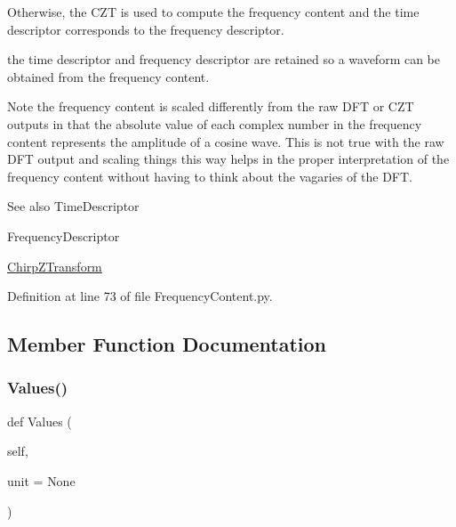 Otherwise, the C\+ZT is used to compute the frequency content and the time descriptor corresponds to the frequency descriptor.

the time descriptor and frequency descriptor are retained so a waveform can be obtained from the frequency content.

\begin{DoxyNote}{Note}
the frequency content is scaled differently from the raw D\+FT or C\+ZT outputs in that the absolute value of each complex number in the frequency content represents the amplitude of a cosine wave. This is not true with the raw D\+FT output and scaling things this way helps in the proper interpretation of the frequency content without having to think about the vagaries of the D\+FT.
\end{DoxyNote}
\begin{DoxySeeAlso}{See also}
Time\+Descriptor 

Frequency\+Descriptor 

\hyperlink{namespaceSignalIntegrity_1_1ChirpZTransform}{Chirp\+Z\+Transform} 
\end{DoxySeeAlso}


Definition at line 73 of file Frequency\+Content.\+py.



\subsection{Member Function Documentation}
\mbox{\label{classSignalIntegrity_1_1FrequencyDomain_1_1FrequencyContent_1_1FrequencyContent_a3dc7b1e5eba8fb649156094dfdf7a893}} 
\subsubsection{\texorpdfstring{Values()}{Values()}}
{\footnotesize\ttfamily def Values (\begin{DoxyParamCaption}\item[{}]{self,  }\item[{}]{unit = {\ttfamily None} }\end{DoxyParamCaption})}



